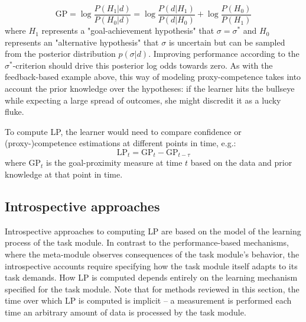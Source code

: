\begin{equation}
   \mathrm{GP} = \log \frac{P(H_1|d)}{P(H_0|d)} = \log \frac{P(d|H_1)}{P(d|H_0)} + \log \frac{P(H_0)}{P(H_1)}
\end{equation}
where $H_1$ represents a "goal-achievement hypothesis" that $\sigma = \sigma^*$ and $H_0$ represents an "alternative hypothesis" that $\sigma$ is uncertain but can be sampled from the posterior distribution $p(\sigma|d)$. Improving performance according to the $\sigma^*$-criterion should drive this posterior log odds towards zero. As with the feedback-based example above, this way of modeling proxy-competence takes into account the prior knowledge over the hypotheses: if the learner hits the bullseye while expecting a large spread of outcomes, she might discredit it as a lucky fluke. 

To compute \ac{LP}, the learner would need to compare confidence or (proxy-)competence estimations at different points in time, e.g.:
\begin{equation}
   \mathrm{LP}_t = \mathrm{GP}_{t} - \mathrm{GP}_{t-\tau}
\end{equation}
where $\mathrm{GP}_t$ is the goal-proximity measure at time $t$ based on the data and prior knowledge at that point in time.

\subsection{Introspective approaches}\label{subsec:introspective_approaches}

Introspective approaches to computing \ac{LP} are based on the model of the learning process of the task module. In contrast to the performance-based mechanisms, where the meta-module observes consequences of the task module's behavior, the introspective accounts require specifying how the task module itself adapts to its task demands. How \ac{LP} is computed depends entirely on the learning mechanism specified for the task module. Note that for methods reviewed in this section, the time over which \ac{LP} is computed is implicit -- a measurement is performed each time an arbitrary amount of data is processed by the task module.

